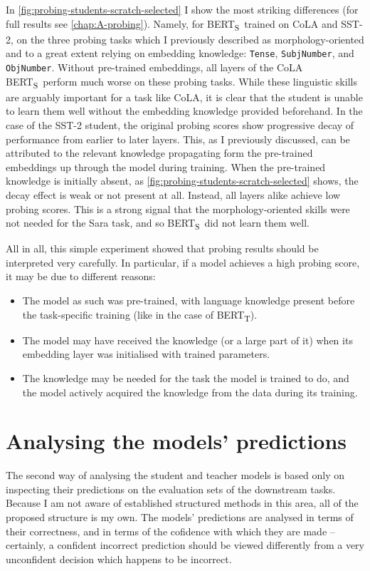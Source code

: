 \documentclass[bsc,frontabs,twoside,singlespacing,parskip,deptreport]{infthesis}
\def\BERTT{BERT\textsubscript{T}}
\def\BERTS{BERT\textsubscript{S}}
\begin{document}
{{{      In \autoref{fig:probing-students-scratch-selected} I show the most striking differences (for full results see \autoref{chap:A-probing}). Namely, for \BERTS~trained on CoLA and SST-2, on the three probing tasks which I previously described as morphology-oriented and to a great extent relying on embedding knowledge: \verb|Tense|, \verb|SubjNumber|, and \verb|ObjNumber|.
      Without pre-trained embeddings, all layers of the CoLA \BERTS~perform much worse on these probing tasks. While these linguistic skills are arguably important for a task like CoLA, it is clear that the student is unable to learn them well without the embedding knowledge provided beforehand.
      In the case of the SST-2 student, the original probing scores show progressive decay of performance from earlier to later layers. This, as I previously discussed, can be attributed to the relevant knowledge propagating form the pre-trained embeddings up through the model during training. When the pre-trained knowledge is initially absent, as \autoref{fig:probing-students-scratch-selected} shows, the decay effect is weak or not present at all. Instead, all layers alike achieve low probing scores. This is a strong signal that the morphology-oriented skills were not needed for the Sara task, and so \BERTS~did not learn them well.

      All in all, this simple experiment showed that probing results should be interpreted very carefully. In particular, if a model achieves a high probing score, it may be due to different reasons:
      \begin{itemize}
        \item The model as such was pre-trained, with language knowledge present before the task-specific training (like in the case of \BERTT).
        \item The model may have received the knowledge (or a large part of it) when its embedding layer was initialised with trained parameters.
        \item The knowledge may be needed for the task the model is trained to do, and the model actively acquired the knowledge from the data during its training.
      \end{itemize}
    }
  }

  \section{Analysing the models' predictions}{
    The second way of analysing the student and teacher models is based only on inspecting their predictions on the evaluation sets of the downstream tasks.
    Because I am not aware of established structured methods in this area, all of the proposed structure is my own.
    The models' predictions are analysed in terms of their correctness, and in terms of the cofidence with which they are made -- certainly, a confident incorrect prediction should be viewed differently from a very unconfident decision which happens to be incorrect.

}}
\end{document}
